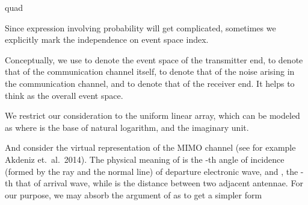 quad\startchapter [title={Problem Setting}]

\startsection [title={Channel Model}]

Since expression involving probability will get complicated, sometimes we explicitly mark the independence on event space index.

Conceptually, we use  to denote the event space of the transmitter end,  to denote that of the communication channel itself,  to denote that of the noise arising in the communication channel, and  to denote that of the receiver end.
It helps to think  as the overall event space.

We restrict our consideration to the uniform linear array, which can be modeled as
where  is the base of natural logarithm, and  the imaginary unit.

And consider the virtual representation of the MIMO channel (see for example Akdeniz et.\ al.\ 2014).
The physical meaning of  is the -th angle of incidence (formed by the ray and the normal line) of departure electronic wave, and , the -th that of arrival wave, while  is the distance between two adjacent antennae.
For our purpose, we may absorb the argument of  as
to get a simpler form

\stopsection

\startsection [title={System Model}]

